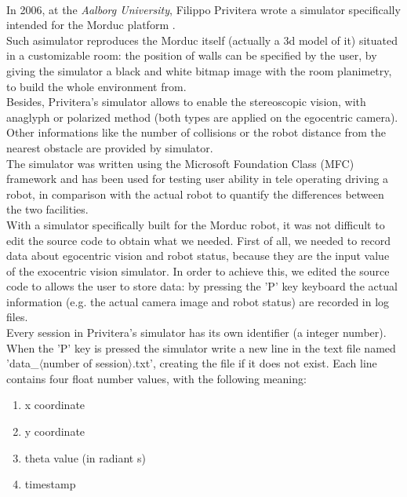 \\
In 2006, at the \textit{Aalborg University}, Filippo 
Privitera wrote a simulator specifically intended for 
the Morduc platform \cite{privitera}. 
\\
Such asimulator reproduces the Morduc itself (actually a 
3d model of it) situated in a customizable room: the position 
of walls can be specified by the user, by giving 
the simulator a black and white bitmap image with the room 
planimetry, to build the whole environment from. 
\\
Besides, Privitera's simulator allows to enable the 
stereoscopic vision, with anaglyph or polarized method (both 
types are applied on the egocentric camera). Other informations 
like the number of collisions or the robot distance from the 
nearest obstacle are provided by simulator.
\\
The simulator was written using the Microsoft Foundation Class
(MFC) framework and has been used for testing user ability in
tele operating driving a robot, in comparison with the actual 
robot to quantify the differences between the two facilities. 
\\
With a simulator specifically built for the Morduc robot, it 
was not difficult to edit the source code to obtain what we 
needed. First of all, we needed to record data about egocentric 
vision and robot status, because they are the input value 
of the exocentric vision simulator. In order to achieve this, 
we edited the source code to allows the user to store data: by 
pressing the 'P' key keyboard the actual information (e.g. the 
actual camera image and robot status) are recorded in log files.
\\
Every session in Privitera's simulator has its own identifier 
(a integer number). When the 'P' key is pressed the simulator 
write a new line in the text file named 'data\_$\langle$number 
of session$\rangle$.txt', creating the file if it does not 
exist. Each line contains four float number values, with the 
following meaning:

\begin{enumerate}
\item x coordinate
\item y coordinate
\item theta value (in radiant s)
\item timestamp
\end{enumerate}

